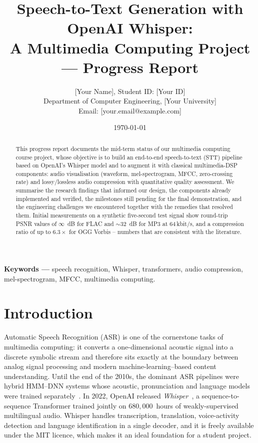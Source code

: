 \documentclass[twocolumn,10pt,a4paper]{article}
\title{Speech-to-Text Generation with OpenAI Whisper:\\
A Multimedia Computing Project --- Progress Report}
\author{[Your Name], Student ID: [Your ID]\\
Department of Computer Engineering, [Your University]\\
Email: [your.email@example.com]}
\date{\today}
\begin{document}
\maketitle

\begin{abstract}
This progress report documents the mid-term status of our multimedia
computing course project, whose objective is to build an end-to-end
speech-to-text (STT) pipeline based on OpenAI's Whisper model and to
augment it with classical multimedia-DSP components: audio visualisation
(waveform, mel-spectrogram, MFCC, zero-crossing rate) and lossy/lossless
audio compression with quantitative quality assessment.  We summarise the
research findings that informed our design, the components already
implemented and verified, the milestones still pending for the final
demonstration, and the engineering challenges we encountered together
with the remedies that resolved them.  Initial measurements on a synthetic
five-second test signal show round-trip PSNR values of $\infty$~dB for FLAC
and $\sim 32$~dB for MP3 at 64\,kbit/s, and a compression ratio of up to
$6.3\times$ for OGG Vorbis -- numbers that are consistent with the
literature.
\end{abstract}

\noindent\textbf{Keywords ---} 
speech recognition, Whisper, transformers, audio compression,
mel-spectrogram, MFCC, multimedia computing.



\section{Introduction}
Automatic Speech Recognition (ASR) is one of the cornerstone tasks of
multimedia computing: it converts a one-dimensional acoustic signal into a
discrete symbolic stream and therefore sits exactly at the boundary between
analog signal processing and modern machine-learning--based content
understanding.  Until the end of the 2010s, the dominant ASR pipelines were
hybrid HMM--DNN systems whose acoustic, pronunciation and language models
were trained separately~\cite{hinton2012deep}.  In 2022, OpenAI released
\emph{Whisper}~\cite{radford2022whisper}, a sequence-to-sequence Transformer
trained jointly on $680{,}000$~hours of weakly-supervised multilingual
audio.  Whisper handles transcription, translation, voice-activity
detection and language identification in a single decoder, and it is freely
available under the MIT licence, which makes it an ideal foundation for a
student project.
\end{document}
